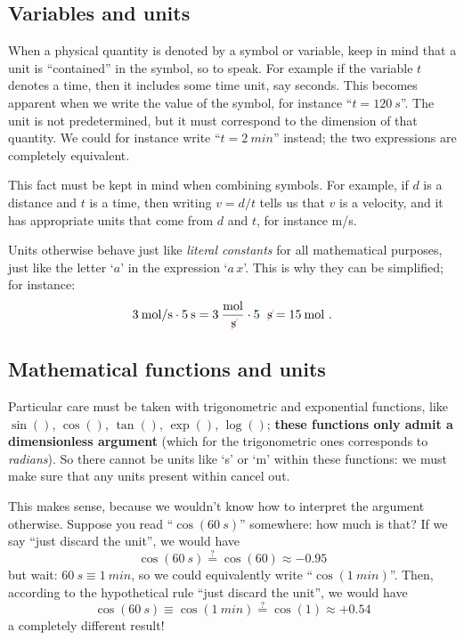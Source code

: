 \documentclass[a4paper,12pt,%
onecolumn,oneside,%
british%
]{memoir}
\renewcommand*{\|}[1][]{\nonscript\:#1\vert\nonscript\:\mathopen{}}
\begin{document}
\subsection{Variables and units}
\label{sec:variables_units}

When a physical quantity is denoted by a symbol or variable, keep in mind that a unit is \enquote{contained} in the symbol, so to speak. For example if the variable $t$ denotes a time, then it includes some time unit, say seconds. This becomes apparent when we write the value of the symbol, for instance \enquote{$t=\qty{120}{s}$}. The unit is not predetermined, but it must correspond to the dimension of that quantity. We could for instance write \enquote{$t=\qty{2}{min}$} instead; the two expressions are completely equivalent.

This fact must be kept in mind when combining symbols. For example, if $d$ is a distance and $t$ is a time, then writing $v=d/t$ tells us that $v$ is a velocity, and it has appropriate units that come from $d$ and $t$, for instance \unit{m/s}.

Units otherwise behave just like \emph{literal constants} for all mathematical purposes, just like the letter \enquote*{$a$} in the expression \enquote*{$a\, x$}. This is why they can be simplified; for instance:
\begin{equation*}
  \qty{3}{mol/s} \cdot \qty{5}{s} =
  \num{3}\:\frac{\unit{mol}}{\mathcolor{red}{\not}\!\unit{s}} \cdot \num{5}\:\mathcolor{red}{\not}\!\unit{s} = \qty{15}{mol} \ .
\end{equation*}

\subsection{Mathematical functions and units}
\label{sec:functions_units}

Particular care must be taken with trigonometric and exponential functions, like $\sin()$, $\cos()$, $\tan()$, $\exp()$, $\log()$; \textbf{these functions only admit a dimensionless argument} (which for the trigonometric ones corresponds to \emph{radians}). So there cannot be units like \enquote*{\unit{s}} or \enquote*{\unit{m}} within these functions: we must make sure that any units present within cancel out.

This makes sense, because we wouldn't know how to interpret the argument otherwise. Suppose you read \enquote{$\cos(\qty{60}{s})$} somewhere: how much is that? If we say \enquote{just discard the unit}, we would have
\begin{equation*}
  \cos(\qty{60}{s}) \stackrel{?}{=} \cos(60) \approx -0.95
\end{equation*}
but wait: $\qty{60}{s}\equiv\qty{1}{min}$, so we could equivalently write \enquote{$\cos(\qty{1}{min})$}. Then, according to the hypothetical rule \enquote{just discard the unit}, we would have
\begin{equation*}
  \cos(\qty{60}{s}) \equiv \cos(\qty{1}{min})\stackrel{?}{=} \cos(1) \approx +0.54
\end{equation*}
a completely different result!
\end{document}
